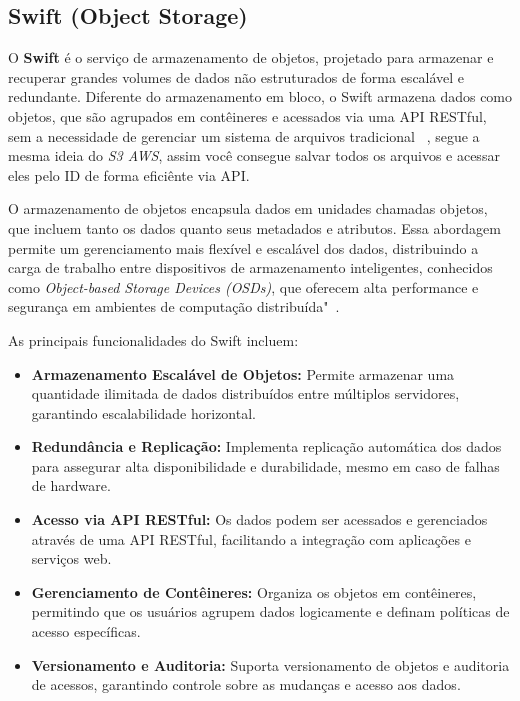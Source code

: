 \subsection{Swift (Object Storage)}

O \textbf{Swift} é o serviço de armazenamento de objetos, projetado para armazenar e recuperar grandes volumes de dados não estruturados de forma escalável e redundante. Diferente do armazenamento em bloco, o Swift armazena dados como objetos, que são agrupados em contêineres e acessados via uma API RESTful, sem a necessidade de gerenciar um sistema de arquivos tradicional ~\citep{OpenStackSwitft}, segue a mesma ideia do \textit{S3 AWS}, assim você consegue salvar todos os arquivos e acessar eles pelo ID de forma eficiênte via API.

O armazenamento de objetos encapsula dados em unidades chamadas objetos, que incluem tanto os dados quanto seus metadados e atributos. Essa abordagem permite um gerenciamento mais flexível e escalável dos dados, distribuindo a carga de trabalho entre dispositivos de armazenamento inteligentes, conhecidos como \textit{Object-based Storage Devices (OSDs)}, que oferecem alta performance e segurança em ambientes de computação distribuída"~\citep{panasas2007object}.

As principais funcionalidades do Swift incluem:

\begin{itemize}
    \item \textbf{Armazenamento Escalável de Objetos:} Permite armazenar uma quantidade ilimitada de dados distribuídos entre múltiplos servidores, garantindo escalabilidade horizontal.
    \item \textbf{Redundância e Replicação:} Implementa replicação automática dos dados para assegurar alta disponibilidade e durabilidade, mesmo em caso de falhas de hardware.
    \item \textbf{Acesso via API RESTful:} Os dados podem ser acessados e gerenciados através de uma API RESTful, facilitando a integração com aplicações e serviços web.
    \item \textbf{Gerenciamento de Contêineres:} Organiza os objetos em contêineres, permitindo que os usuários agrupem dados logicamente e definam políticas de acesso específicas.
    \item \textbf{Versionamento e Auditoria:} Suporta versionamento de objetos e auditoria de acessos, garantindo controle sobre as mudanças e acesso aos dados.
\end{itemize}

